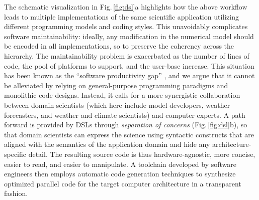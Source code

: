 \documentclass[gmd,manuscript,online]{copernicus}
\theoremstyle{theorem}
\theoremstyle{definition}
\theoremstyle{remark}
\theoremstyle{proposition}
\begin{document}
	The schematic visualization in Fig.\,\ref{fig:dsl}a highlights how the above workflow leads to multiple implementations of the same scientific application utilizing different programming models and coding styles. This unavoidably complicates software maintainability: ideally, any modification in the numerical model should be encoded in all implementations, so to preserve the coherency across the hierarchy. The maintainability problem is exacerbated as the number of lines of code, the pool of platforms to support, and the user-base increase. This situation has been known as the ``software productivity gap'' \citep{lawrence18}, and we argue that it cannot be alleviated by relying on general-purpose programming paradigms and monolithic code designs. Instead, it calls for a more synergistic collaboration between domain scientists (which here include model developers, weather forecasters, and weather and climate scientists) and computer experts. A path forward is provided by DSLs through \emph{separation of concerns} (Fig.\,\ref{fig:dsl}b), so that domain scientists can express the science using syntactic constructs that are aligned with the semantics of the application domain and hide any architecture-specific detail. The resulting source code is thus hardware-agnostic, more concise, easier to read, and easier to manipulate. A toolchain developed by software engineers then employs automatic code generation techniques to synthesize optimized parallel code for the target computer architecture in a transparent fashion.
\end{document}
